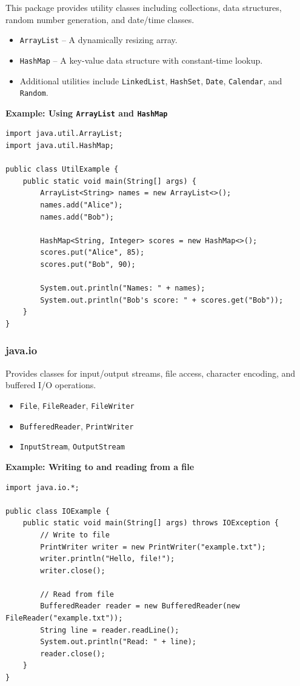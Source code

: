 \documentclass{article}
\newcommand{\codecmd}[1]{\textcolor[rgb]{0,0.5,0}{\texttt{#1}}}
\begin{document}
This package provides utility classes including collections, data structures, random number generation, and date/time classes.

\begin{itemize}
    \item \codecmd{ArrayList} – A dynamically resizing array.
    \item \codecmd{HashMap} – A key-value data structure with constant-time lookup.
    \item Additional utilities include \codecmd{LinkedList}, \codecmd{HashSet}, \codecmd{Date}, \codecmd{Calendar}, and \codecmd{Random}.
\end{itemize}

\noindent\textbf{Example: Using \codecmd{ArrayList} and \codecmd{HashMap}}
\begin{verbatim}
import java.util.ArrayList;
import java.util.HashMap;

public class UtilExample {
    public static void main(String[] args) {
        ArrayList<String> names = new ArrayList<>();
        names.add("Alice");
        names.add("Bob");

        HashMap<String, Integer> scores = new HashMap<>();
        scores.put("Alice", 85);
        scores.put("Bob", 90);

        System.out.println("Names: " + names);
        System.out.println("Bob's score: " + scores.get("Bob"));
    }
}
\end{verbatim}

\subsubsection*{java.io}

Provides classes for input/output streams, file access, character encoding, and buffered I/O operations.

\begin{itemize}
    \item \codecmd{File}, \codecmd{FileReader}, \codecmd{FileWriter}
    \item \codecmd{BufferedReader}, \codecmd{PrintWriter}
    \item \codecmd{InputStream}, \codecmd{OutputStream}
\end{itemize}

\noindent\textbf{Example: Writing to and reading from a file}
\begin{verbatim}
import java.io.*;

public class IOExample {
    public static void main(String[] args) throws IOException {
        // Write to file
        PrintWriter writer = new PrintWriter("example.txt");
        writer.println("Hello, file!");
        writer.close();

        // Read from file
        BufferedReader reader = new BufferedReader(new FileReader("example.txt"));
        String line = reader.readLine();
        System.out.println("Read: " + line);
        reader.close();
    }
}
\end{verbatim}
\end{document}
